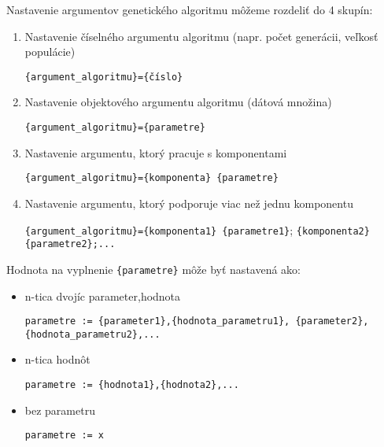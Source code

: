 Nastavenie argumentov genetického algoritmu môžeme rozdeliť do  4 skupín:
\begin{enumerate}
\item Nastavenie číselného argumentu algoritmu (napr. počet generácii, veľkosť populácie)
\begin{center}
\texttt{\{argument\_algoritmu\}=\{číslo\}}
\end{center} 
\item Nastavenie objektového argumentu algoritmu (dátová množina)
\begin{center}
\texttt{\{argument\_algoritmu\}=\{parametre\}}
\end{center} 
\item Nastavenie argumentu, ktorý pracuje s komponentami
\begin{center}
\texttt{\{argument\_algoritmu\}=\{komponenta\} \{parametre\}}
\end{center}
\item Nastavenie argumentu, ktorý podporuje viac než jednu komponentu
\begin{center}
\texttt{\{argument\_algoritmu\}=\{komponenta1\} \{parametre1\}};
\texttt{\{komponenta2\} \{parametre2\};...}
\end{center}
\end{enumerate}

Hodnota na vyplnenie \texttt{\{parametre\}} môže byť nastavená ako:
\begin{itemize}
\item n-tica dvojíc parameter,hodnota
\begin{center}
\texttt{parametre := \{parameter1\},\{hodnota\_parametru1\},
\{parameter2\},\{hodnota\_parametru2\},...} 
\end{center}
\item n-tica hodnôt
\begin{center}
\texttt{parametre := \{hodnota1\},\{hodnota2\},...} 
\end{center}
\item bez parametru
\begin{center}
\texttt{parametre := x} 
\end{center}
\end{itemize}

